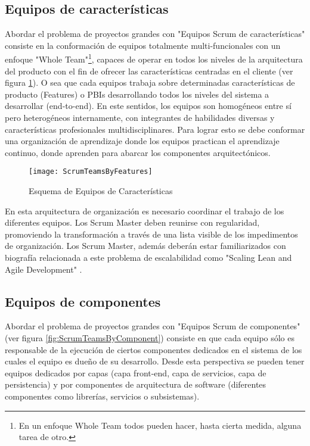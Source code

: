 \subsection{Equipos de características}

Abordar el problema de proyectos grandes con "Equipos Scrum de características" consiste en la conformación de equipos totalmente multi-funcionales con un enfoque "Whole Team"\footnote{En un enfoque Whole Team todos pueden hacer, hasta cierta medida, alguna tarea de otro\cite{Juan-Gabardini-2015}.}, capaces de operar en todos los niveles de la arquitectura del producto con el fin de ofrecer las características centradas en el cliente (ver figura \ref{fig:ScrumTeamsByFeatures}). O sea que cada equipos trabaja sobre determinadas características de producto (Features) o PBIs desarrollando todos los niveles del sistema a desarrollar (end-to-end). En este sentidos, los equipos son homogéneos entre sí pero heterogéneos internamente, con integrantes de habilidades diversas y características profesionales multidisciplinares. Para lograr esto se debe conformar una organización de aprendizaje donde los equipos practican el aprendizaje continuo, donde aprenden para abarcar los componentes arquitectónicos.

\begin{figure}[h]
  \centering
  \texttt{[image: ScrumTeamsByFeatures]}
  \caption{Esquema de Equipos de Características}
  \centering
  \label{fig:ScrumTeamsByFeatures} %
\end{figure}

En esta arquitectura de organización es necesario coordinar el trabajo de los diferentes equipos. Los Scrum Master deben reunirse con regularidad, promoviendo la transformación a través de una lista visible de los impedimentos de organización. Los Scrum Master, además deberán estar familiarizados con biografía relacionada a este problema de escalabilidad como "Scaling Lean and Agile Development" \cite{Larman-Vodde-2008}.

\subsection{Equipos de componentes}

Abordar el problema de proyectos grandes con "Equipos Scrum de componentes" (ver figura \ref{fig:ScrumTeamsByComponent}) consiste en que cada equipo sólo es responsable de la ejecución de ciertos componentes dedicados en el sistema de los cuales el equipo es dueño de su desarrollo. Desde esta perspectiva se pueden tener equipos dedicados por capas (capa front-end, capa de servicios, capa de persistencia) y por componentes de arquitectura de software (diferentes componentes como librerías, servicios o subsistemas).

